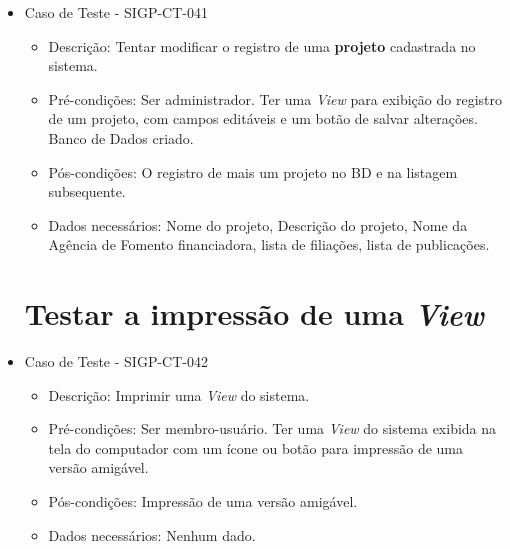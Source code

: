 \documentclass[11pt, a4paper]{book}
\begin{document}
\begin{itemize}
	\item Caso de Teste - SIGP-CT-041
	\begin{itemize}
	\item Descrição:  Tentar modificar o registro de uma \textbf{projeto} cadastrada no sistema.
\item Pré-condições: Ser administrador. Ter uma \emph{View} para exibição do registro de um projeto, com campos editáveis e um botão de salvar alterações. Banco de Dados criado.
	\item Pós-condições: O registro de mais um projeto no BD e na listagem subsequente.
	\item Dados necessários: Nome do projeto, Descrição do projeto, Nome da Agência de Fomento financiadora, lista de filiações, lista de publicações.
	\end{itemize}


\newpage
\section{Testar a impressão de uma \emph{View}}
	\item Caso de Teste - SIGP-CT-042
	\begin{itemize}
	\item Descrição: Imprimir uma \emph{View} do sistema.
	\item Pré-condições: Ser membro-usuário. Ter uma \emph{View} do sistema exibida na tela do computador com um ícone ou botão para impressão de uma versão amigável.
	\item Pós-condições: Impressão de uma versão amigável.
	\item Dados necessários: Nenhum dado.
	\end{itemize}





\end{itemize}
\end{document}
